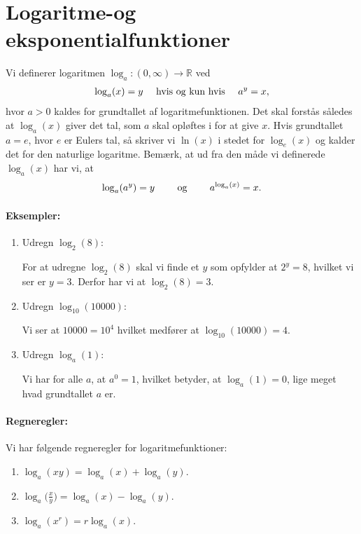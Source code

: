 \section{Logaritme-og eksponentialfunktioner}
Vi definerer logaritmen $\log_a \colon (0,\infty) \to \mathbb{R}$ ved
\begin{align*}
\log_a(x) = y \quad \textup{ hvis og kun hvis } \quad a^y=x,
\end{align*}
hvor $a>0$ kaldes for grundtallet af logaritmefunktionen. Det skal forstås således at $\log_a(x)$ giver det tal, som $a$ skal opløftes i for at give $x$. Hvis grundtallet $a=e$, hvor $e$ er Eulers tal, så skriver vi $\ln(x)$ i stedet for $\log_e(x)$ og kalder det for den naturlige logaritme. Bemærk, at ud fra den måde vi definerede $\log_a(x)$ har vi, at
\begin{align}\label{eq:funktioner4et}
\log_a(a^y)=y \qquad \textup{ og } \qquad a^{\log_a(x)}=x.
\end{align}

\paragraph*{Eksempler:}
\begin{enumerate}
\item Udregn $\log_2(8)$:

For at udregne $\log_2(8)$ skal vi finde et $y$ som opfylder at $2^y=8$, hvilket vi ser er $y=3$. Derfor har vi at $\log_2(8)=3$.
\item Udregn $\log_{10}(10000)$:

Vi ser at $10000=10^4$ hvilket medfører at $\log_{10}(10000)=4$.
\item Udregn $\log_a(1)$:

Vi har for alle $a$, at $a^0=1$, hvilket betyder, at $\log_a(1)=0$, lige meget hvad grundtallet $a$ er.
\end{enumerate}

\paragraph*{Regneregler:}
Vi har følgende regneregler for logaritmefunktioner:
\begin{enumerate}
\item $\log_a(xy)=\log_a(x)+\log_a(y)$.
\item $\log_a\big(\frac{x}{y}\big) = \log_a(x)-\log_a(y)$.
\item $\log_a(x^r) = r\log_a(x)$.
\end{enumerate}

